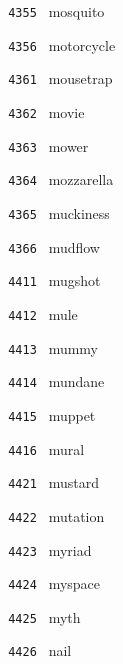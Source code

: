 \documentclass[11pt]{article}
\begin{document}
\begin{multicols}{6}
\noindent \texttt{ 4355 } \hspace{1mm} mosquito  \par
\noindent \texttt{ 4356 } \hspace{1mm} motorcycle  \par
\noindent \texttt{ 4361 } \hspace{1mm} mousetrap  \par
\noindent \texttt{ 4362 } \hspace{1mm} movie  \par
\noindent \texttt{ 4363 } \hspace{1mm} mower  \par
\noindent \texttt{ 4364 } \hspace{1mm} mozzarella  \par
\noindent \texttt{ 4365 } \hspace{1mm} muckiness  \par
\noindent \texttt{ 4366 } \hspace{1mm} mudflow  \par
\noindent \texttt{ 4411 } \hspace{1mm} mugshot  \par
\noindent \texttt{ 4412 } \hspace{1mm} mule  \par
\noindent \texttt{ 4413 } \hspace{1mm} mummy  \par
\noindent \texttt{ 4414 } \hspace{1mm} mundane  \par
\noindent \texttt{ 4415 } \hspace{1mm} muppet  \par
\noindent \texttt{ 4416 } \hspace{1mm} mural  \par
\noindent \texttt{ 4421 } \hspace{1mm} mustard  \par
\noindent \texttt{ 4422 } \hspace{1mm} mutation  \par
\noindent \texttt{ 4423 } \hspace{1mm} myriad  \par
\noindent \texttt{ 4424 } \hspace{1mm} myspace  \par
\noindent \texttt{ 4425 } \hspace{1mm} myth  \par
\noindent \texttt{ 4426 } \hspace{1mm} nail  \par

\end{multicols}
\end{document}
